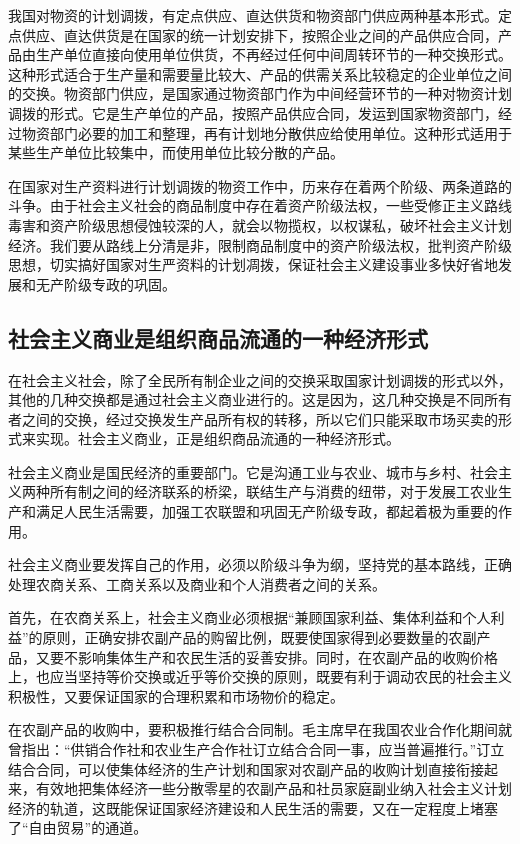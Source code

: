\documentclass{book}
\begin{document}
我国对物资的计划调拨，有定点供应、直达供货和物资部门供应两种基本形式。定点供应、直达供货是在国家的统一计划安排下，按照企业之间的产品供应合同，产品由生产单位直接向使用单位供货，不再经过任何中间周转环节的一种交换形式。这种形式适合于生产量和需要量比较大、产品的供需关系比较稳定的企业单位之间的交换。物资部门供应，是国家通过物资部门作为中间经营环节的一种对物资计划调拨的形式。它是生产单位的产品，按照产品供应合同，发运到国家物资部门，经过物资部门必要的加工和整理，再有计划地分散供应给使用单位。这种形式适用于某些生产单位比较集中，而使用单位比较分散的产品。

在国家对生产资料进行计划调拨的物资工作中，历来存在着两个阶级、两条道路的斗争。由于社会主义社会的商品制度中存在着资产阶级法权，一些受修正主义路线毒害和资产阶级思想侵蚀较深的人，就会以物揽权，以权谋私，破坏社会主义计划经济。我们要从路线上分清是非，限制商品制度中的资产阶级法权，批判资产阶级思想，切实搞好国家对生严资料的计划凋拨，保证社会主义建设事业多快好省地发展和无产阶级专政的巩固。

\subsection{社会主义商业是组织商品流通的一种经济形式}

在社会主义社会，除了全民所有制企业之间的交换采取国家计划调拨的形式以外，其他的几种交换都是通过社会主义商业进行的。这是因为，这几种交换是不同所有者之间的交换，经过交换发生产品所有权的转移，所以它们只能采取市场买卖的形式来实现。社会主义商业，正是组织商品流通的一种经济形式。

社会主义商业是国民经济的重要部门。它是沟通工业与农业、城市与乡村、社会主义两种所有制之间的经济联系的桥梁，联结生产与消费的纽带，对于发展工农业生产和满足人民生活需要，加强工农联盟和巩固无产阶级专政，都起着极为重要的作用。

社会主义商业要发挥自己的作用，必须以阶级斗争为纲，坚持党的基本路线，正确处理农商关系、工商关系以及商业和个人消费者之间的关系。

首先，在农商关系上，社会主义商业必须根据“兼顾国家利益、集体利益和个人利益”的原则，正确安排农副产品的购留比例，既要使国家得到必要数量的农副产品，又要不影响集体生产和农民生活的妥善安排。同时，在农副产品的收购价格上，也应当坚持等价交换或近乎等价交换的原则，既要有利于调动农民的社会主义积极性，又要保证国家的合理积累和市场物价的稳定。

在农副产品的收购中，要积极推行结合合同制。毛主席早在我国农业合作化期间就曾指出：“供销合作社和农业生产合作社订立结合合同一事，应当普遍推行。”订立结合合同，可以使集体经济的生产计划和国家对农副产品的收购计划直接衔接起来，有效地把集体经济一些分散零星的农副产品和社员家庭副业纳入社会主义计划经济的轨道，这既能保证国家经济建设和人民生活的需要，又在一定程度上堵塞了“自由贸易”的通道。
\end{document}
